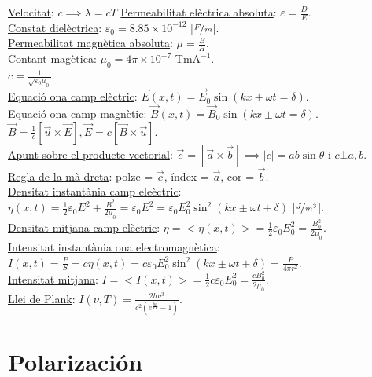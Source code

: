 \documentclass[10pt]{article}
\newcommand{\ci}{\textbullet\;}
\begin{document}
\begin{multicols}{4}
\ul{Velocitat}: $c \implies \lambda = cT$
\ul{Permeabilitat el\`ectrica absoluta}: $\varepsilon = \frac{D}{E}$. \\
\ul{Constat diel\`ectrica}: $\varepsilon_0 = 8.85\times 10^{-12}$ [$\nicefrac{F}{m}$]. \\
\ul{Permeabilitat magn\`etica absoluta}: $\mu = \frac{B}{H}$. \\
\ul{Contant mag\`etica}: $\mu_0 = 4\pi \times 10^{-7}$ Tm$\text{A}^{-1}$. \\
\ci $c = \frac{1}{\sqrt{\varepsilon_0\mu_0}}$. \\
\ul{Equaci\'o ona camp el\`ectric}: $\vec{E}\left( x,t \right) = \vec{E}_0\sin\left( kx \pm \omega t= \delta \right)$. \\
\ul{Equaci\'o ona camp magn\`etic}: $\vec{B}\left( x,t \right) = \vec{B}_0\sin\left( kx \pm \omega t= \delta \right)$. \\
$\vec{B} = \frac{1}{c}\left[ \vec{u} \times \vec{E} \right], \vec{E} = c \left[ \vec{B} \times \vec{u} \right]$. \\
\ul{Apunt sobre el producte vectorial}: $\vec{c} = \left[ \vec{a} \times \vec{b} \right] \implies |c| = ab\sin\theta$ i $c \bot a,b$. \\
\ul{Regla de la m\`a dreta}: polze = $\vec{c}$, \'index = $\vec{a}$, cor = $\vec{b}$. \\
\ul{Densitat instant\`ania camp ele\`ectric}: $\eta\left( x,t \right) = \frac{1}{2}\varepsilon_0 E^2 + \frac{B^2}{2\mu_0} = \varepsilon_0 E^2 = \varepsilon_0 E_0^2\sin^2\left( kx \pm \omega t + \delta \right)$ [$\nicefrac{J}{m^3}$]. \\
\ul{Densitat mitjana camp el\`ectric}: $\eta = <\eta\left( x,t \right)> = \frac{1}{2}\varepsilon_0 E_0^2 = \frac{B_0^2}{2\mu_0}$. \\
\ul{Intensitat instant\`ania ona electromagn\`etica}: $I\left( x,t \right) = \frac{P}{S} = c\eta\left( x,t \right) = c\varepsilon_0 E_0^2\sin^2\left( kx \pm \omega t+ \delta \right) = \frac{P}{4\pi r^2}$. \\
\ul{Intensitat mitjana}: $I = <I\left( x,t \right)> = \frac{1}{2}c\varepsilon_0 E_0^2 = \frac{c B_0^2}{2\mu_0}$. \\
\ul{Llei de Plank}: $I\left( \nu,T \right) = \frac{2h\nu^3}{c^2 (e^{\frac{h\nu}{kT}} - 1)}$.

\section{Polarizaci\'on}



\end{multicols}
\end{document}
